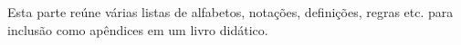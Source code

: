 \documentclass[../../include/open-logic-part]{subfiles}
\begin{document}

\begin{editorial}
  Esta parte reúne várias listas de alfabetos, notações,
  definições, regras etc. para inclusão como apêndices em um livro didático.
\end{editorial}



\OLEndPartHook
\end{document}
